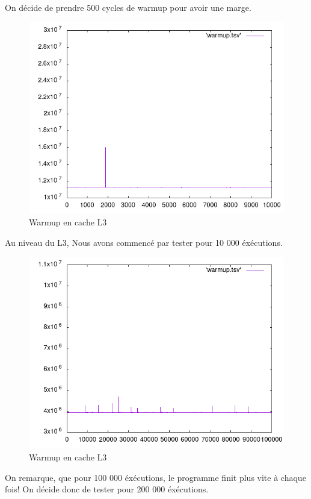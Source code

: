 \documentclass{report}
\begin{document}
    On décide de prendre 500 cycles de warmup pour avoir une marge.

\newpage 
    \begin{figure}[ht!]
        \centering
        \includegraphics[width=120mm]{MEDIA/warmupL3_NOCstate.png}
        \caption{Warmup en cache L3}
    \end{figure}

Au niveau du L3, Nous avons commencé par tester pour 10 000 éxécutions. 

\newpage 
    \begin{figure}[ht!]
        \centering
        \includegraphics[width=120mm]{MEDIA/warmupL3_100000.png}
        \caption{Warmup en cache L3 }
    \end{figure}

On remarque, que pour 100 000 éxécutions, le programme finit plus vite à chaque fois!
On décide donc de tester pour 200 000 éxécutions.
\end{document}
